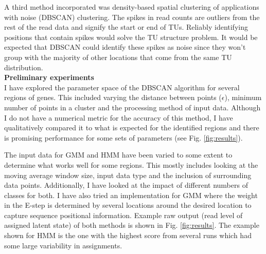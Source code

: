 \documentclass[11pt]{article}
\begin{document}
A third method incorporated was density-based spatial clustering of applications with noise (DBSCAN) clustering.  The spikes in read counts are outliers from the rest of the read data and signify the start or end of TUs.  Reliably identifying positions that contain spikes would solve the TU structure problem.  It would be expected that DBSCAN could identify these spikes as noise since they won't group with the majority of other locations that come from the same TU distribution. \\

\textbf{Preliminary experiments} \vspace{4pt} \\
I have explored the parameter space of the DBSCAN algorithm for several regions of genes.  This included varying the distance between points ($\epsilon$), minimum number of points in a cluster and the processing method of input data.  Although I do not have a numerical metric for the accuracy of this method, I have qualitatively compared it to what is expected for the identified regions and there is promising performance for some sets of parameters (see Fig. \ref{fig:results}). \vspace{8pt}

The input data for GMM and HMM have been varied to some extent to determine what works well for some regions.  This mostly includes looking at the moving average window size, input data type and the inclusion of surrounding data points.  Additionally, I have looked at the impact of different numbers of classes for both.  I have also tried an implementation for GMM where the weight in the E-step is determined by several locations around the desired location to capture sequence positional information.  Example raw output (read level of assigned latent state) of both methods is shown in Fig. \ref{fig:results}.  The example shown for HMM is the one with the highest score from several runs which had some large variability in assignments.
\end{document}
